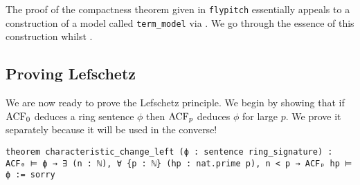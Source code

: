 \begin{rmk}
  The proof of the compactness theorem given in \texttt{flypitch} essentially
  appeals to a construction of a model called
  \texttt{term\_model} via .
  We go through the essence of this construction whilst
  .
\end{rmk}

\subsection{Proving Lefschetz}

We are now ready to prove the Lefschetz principle.
We begin by showing that if $\operatorname{ACF}_{0}$ deduces a ring sentence $\phi$
then $\operatorname{ACF}_{p}$ deduces $\phi$ for large $p$.
We prove it separately because it will be used in the converse!

\begin{lstlisting}
theorem characteristic_change_left (ϕ : sentence ring_signature) :
ACF₀ ⊨ ϕ → ∃ (n : ℕ), ∀ {p : ℕ} (hp : nat.prime p), n < p → ACFₚ hp ⊨ ϕ := sorry \end{lstlisting}

